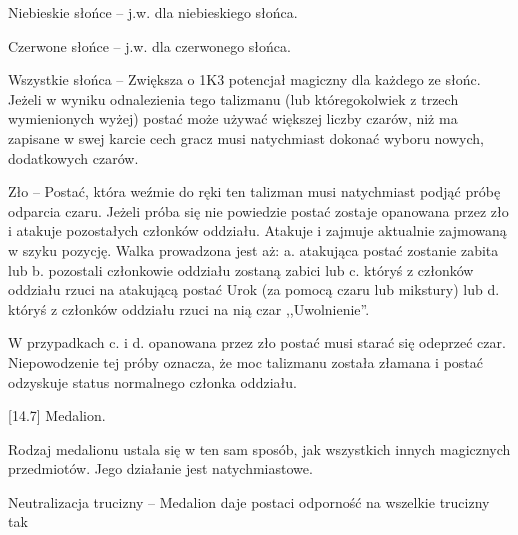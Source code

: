 Niebieskie słońce – j.w. dla niebieskiego słońca.

Czerwone słońce – j.w. dla czerwonego słońca.

Wszystkie słońca – Zwiększa o 1K3 potencjał magiczny dla każdego ze słońc.
Jeżeli w wyniku odnalezienia tego talizmanu (lub któregokolwiek z trzech wymienionych wyżej) postać może używać większej liczby czarów, niż ma zapisane w swej karcie cech gracz musi natychmiast dokonać wyboru nowych, dodatkowych czarów.

Zło – Postać, która weźmie do ręki ten talizman musi natychmiast podjąć próbę odparcia czaru.
Jeżeli próba się nie powiedzie postać zostaje opanowana przez zło i atakuje pozostałych członków oddziału.
Atakuje i zajmuje aktualnie zajmowaną w szyku pozycję.
Walka prowadzona jest aż: a. atakująca postać zostanie zabita lub b. pozostali członkowie oddziału zostaną zabici lub c. któryś z członków oddziału rzuci na atakującą postać Urok (za pomocą czaru lub mikstury) lub d. któryś z członków oddziału rzuci na nią czar ,,Uwolnienie''.

W przypadkach c. i d. opanowana przez zło postać musi starać się odeprzeć czar.
Niepowodzenie tej próby oznacza, że moc talizmanu została złamana i postać odzyskuje status normalnego członka oddziału.

[14.7] Medalion.

Rodzaj medalionu ustala się w ten sam sposób, jak wszystkich innych magicznych przedmiotów.
Jego działanie jest natychmiastowe.

Neutralizacja trucizny – Medalion daje postaci odporność na wszelkie trucizny tak